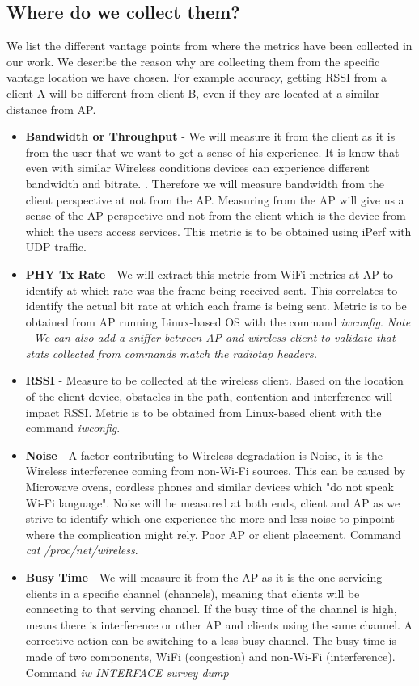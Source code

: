 \subsection{Where do we collect them?}

We list the different vantage points from where the metrics have been collected in our work. We describe the reason why are collecting them from the specific vantage location we have chosen. For example accuracy, getting RSSI from a client A will be different from client B, even if they are located at a similar distance from AP.

\begin{itemize}
	\item \textbf{Bandwidth or Throughput} - We will measure it from the client as it is from the user that we want to get a sense of his experience. It is know that even with similar Wireless conditions devices can experience different bandwidth and bitrate. \cite{measuring_user_traffic}. Therefore we will measure bandwidth from the client perspective at not from the AP. Measuring from the AP will give us a sense of the AP perspective and not from the client which is the device from which the users access services. This metric is to be obtained using iPerf with UDP traffic.
	\item \textbf{PHY Tx Rate} - We will extract this metric from WiFi metrics at AP to identify at which rate was the frame being received sent. This correlates to identify the actual bit rate at which each frame is being sent. Metric is to be obtained from AP running Linux-based OS with the command \emph{iwconfig}.
	\emph{Note - We can also add a sniffer between AP and wireless client to validate that stats collected from commands match the radiotap headers.}
	\item \textbf{RSSI} - Measure to be collected at the wireless client. Based on the location of the client device, obstacles in the path, contention and interference will impact RSSI. Metric is to be obtained from Linux-based client with the command \emph{iwconfig}.
	\item \textbf{Noise} - A factor contributing to Wireless degradation is Noise, it is the Wireless interference coming from non-Wi-Fi sources. This can be caused by Microwave ovens, cordless phones and similar devices which "do not speak Wi-Fi language". Noise will be measured at both ends, client and AP as we strive to identify which one experience the more and less noise to pinpoint where the complication might rely. Poor AP or client placement. Command \emph{cat /proc/net/wireless}.
	\item \textbf{Busy Time} - We will measure it from the AP as it is the one servicing clients in a specific channel (channels), meaning that clients will be connecting to that serving channel. If the busy time of the channel is high, means there is interference or other AP and clients using the same channel. A corrective action can be switching to a less busy channel. The busy time is made of two components, WiFi (congestion) and non-Wi-Fi (interference). Command \emph{iw INTERFACE survey dump}	
		
\end{itemize}
